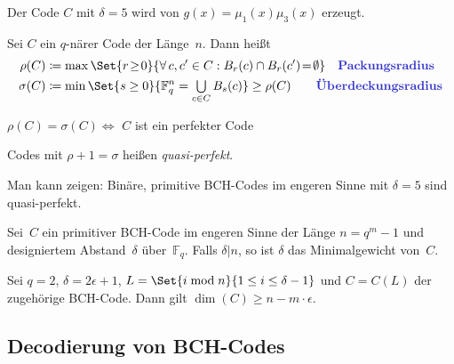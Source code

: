 \documentclass{cheat-sheet}
\newcommand{\F}{\mathbb{F}} %
\newcommand{\divides}{|} %
\begin{document}
\begin{bem}
  Der Code $C$ mit $\delta = 5$ wird von $g(x) = \mu_1(x) \mu_3(x)$ erzeugt.
\end{bem}

\begin{defn}
  Sei $C$ ein $q$-närer Code der Länge~$n$.
  Dann heißt
  \begin{align*}
    \rho(C) & \coloneqq \max \Set{r \!\geq\! 0}{\forall \, c, c' \in C : B_r(c) \cap B_r(c') \!=\! \emptyset} \quad
    \text{\emph{Packungsradius}} \\
    \sigma(C) & \coloneqq \min \Set{s \geq 0}{\F_q^n = \bigcup_{c \in C} B_s(c)} \geq \rho(C) \qquad
    \text{\emph{Überdeckungsradius}}
  \end{align*}
\end{defn}

\begin{bem}
  $\rho(C) = \sigma(C) \iff $ $C$ ist ein perfekter Code
\end{bem}

\begin{defn}
  Codes mit $\rho + 1 = \sigma$ heißen \emph{quasi-perfekt}.
\end{defn}

\begin{bsp}
  Man kann zeigen: Binäre, primitive BCH-Codes im engeren Sinne mit $\delta = 5$ sind quasi-perfekt.
\end{bsp}

\begin{prop}
  Sei~$C$ ein primitiver BCH-Code im engeren Sinne der Länge $n = q^m - 1$ und designiertem Abstand~$\delta$ über~$\F_q$.
  Falls $\delta \divides n$, so ist $\delta$ das Minimalgewicht von~$C$.
\end{prop}


\begin{satz}
  Sei $q = 2$, $\delta = 2 \epsilon + 1$, $L = \Set{i \bmod{n}}{1 \leq i \leq \delta - 1}$ und $C = C(L)$ der zugehörige BCH-Code.
  Dann gilt $\dim(C) \geq n - m \cdot \epsilon$.
\end{satz}


\subsection{Decodierung von BCH-Codes}
\end{document}
